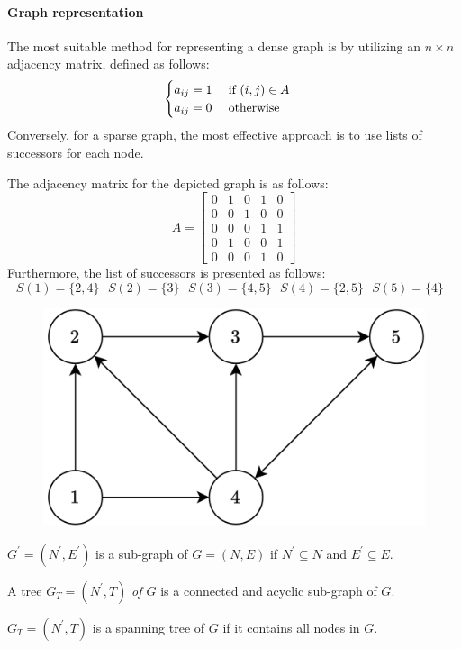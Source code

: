 \paragraph*{Graph representation}
The most suitable method for representing a dense graph is by utilizing an $n \times n$ adjacency matrix, defined as follows:
\[
\begin{cases}
    a_{ij}=1 \:\:\:\:\:\: \textnormal{if }(i,j) \in A \\
    a_{ij}=0 \:\:\:\:\:\: \textnormal{otherwise}    
\end{cases}    
\]
Conversely, for a sparse graph, the most effective approach is to use lists of successors for each node.
\begin{example}
    The adjacency matrix for the depicted graph is as follows:
    \[A=\begin{bmatrix}
        0 & 1 & 0 & 1 & 0 \\
        0 & 0 & 1 & 0 & 0 \\
        0 & 0 & 0 & 1 & 1 \\
        0 & 1 & 0 & 0 & 1 \\
        0 & 0 & 0 & 1 & 0 
        \end{bmatrix}\]
    Furthermore, the list of successors is presented as follows:
    \[S(1)=\{2,4\} \:\:\: S(2)=\{3\} \:\:\:S(3)=\{4,5\} \:\:\: S(4)=\{2,5\} \:\:\: S(5)=\{4\} \:\:\:\]
    \begin{figure}[H]
        \centering
        \includegraphics[width=0.3\linewidth]{images/graphs.png}
    \end{figure}
\end{example}
\begin{definition}
    $G^{'}=(N^{'},E^{'})$ is a sub-graph of $G=(N,E)$ if $N^{'} \subseteq N$ and $E^{'} \subseteq E$. 
\end{definition}
\begin{definition}
    A tree $G_T=(N^{'},T)$ \emph{of $G$} is a connected and acyclic sub-graph of $G$. 
\end{definition}
\begin{definition}
    $G_T=(N^{'},T)$ is a spanning tree of $G$ if it contains all nodes in $G$. 
\end{definition}
